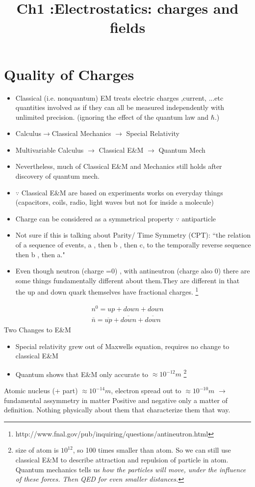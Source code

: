 \documentclass[12 pt , twoside, letterpaper] {article}
\begin{document}
\title {Ch1 :Electrostatics: charges and fields}
\date {}
\maketitle
\vspace{-80pt}
\section {Quality of Charges}
\begin{itemize}
\item Classical (i.e. nonquantum) EM treats electric charges ,current, ...etc quantities involved as if they can all be measured independently with unlimited precision. (ignoring the effect of the quantum law and $\hbar$.)
\item Calculus$\rightarrow$Classical Mechanics $\rightarrow$ Special Relativity
\item Multivariable Calculus $\rightarrow$ Classical E\&M $\rightarrow$ Quantum Mech
\item Nevertheless, much of Classical E\&M and Mechanics still holds after discovery of quantum mech.
\item $\because$ Classical E\&M are based on experiments  works on everyday things (capacitors, coils, radio, light waves but not for inside a molecule)

\item Charge can be considered as a symmetrical property $\because$ antiparticle
\item  Not sure if this is talking about Parity/ Time Symmetry (CPT):
``the relation of a sequence of events, a , then b , then c, to the temporally reverse sequence then b , then a."
\item Even though neutron (charge =0) , with antineutron (charge also 0) there are some things fundamentally different about them.They are different in that the up and down quark themselves have fractional charges. \footnote{http://www.fnal.gov/pub/inquiring/questions/antineutron.html}
\end{itemize}
\begin {align}
n^{0} = up+down+down \\
\bar n= \overline{up} + \overline{down}+ \overline{down}
\end {align}
Two Changes to E\&M
\begin{itemize}
\item Special relativity grew out of Maxwells equation, requires no change to classical E\&M
\item Quantum shows that E\&M only accurate to $\approx 10^{-12} m$ \footnote{size of atom is $10^{12}$, so 100 times smaller than atom. So we can still use classical E\&M to describe attraction and repulsion of particle in atom. Quantum mechanics tells us \it how \rm the particles will move, under the influence of these forces. Then QED for even smaller distances.}
\end{itemize}
Atomic nucleus (+ part) $\approx 10^{-14} m$, electron spread out to $\approx 10^{-10} m$  $\rightarrow$ fundamental assymmetry in matter
Positive and negative only a matter of definition. Nothing physically about them that characterize them that way.
\end{document}
